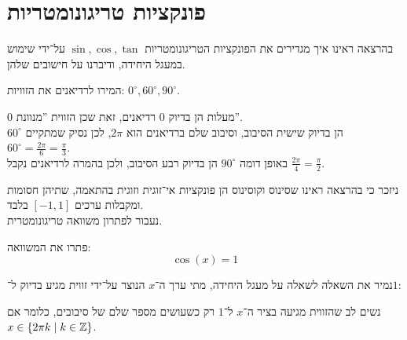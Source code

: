 \section{פונקציות טריגונומטריות}
בהרצאה ראינו איך מגדירים את הפונקציות הטריגונומטריות $\sin, \cos, \tan$ על־ידי שימוש במעגל היחידה, ודיברנו על חישובים שלהן.
\begin{exercise}
	המירו לרדיאנים את הזוויות: $0^\circ, 60^\circ, 90^\circ$.
\end{exercise}
\begin{solution}
	$0$ מעלות הן בדיוק $0$ רדיאנים, זאת שכן הזווית ''מנוונת''. \\
	$60^\circ$ הן בדיוק שישית הסיבוב, וסיבוב שלם ברדיאנים הוא $2 \pi$, לכן נסיק שמתקיים $60^\circ = \frac{2 \pi}{6} = \frac{\pi}{3}$. \\
	באופן דומה $90^\circ$ הן בדיוק רבע הסיבוב, ולכן בהמרה לרדיאנים נקבל $\frac{2 \pi}{4} = \frac{\pi}{2}$.
\end{solution}
ניזכר כי בהרצאה ראינו שסינוס וקוסינוס הן פונקציות אי־זוגית וזוגית בהתאמה, שתיהן חסומות ומקבלות ערכים $[-1, 1]$ בלבד. \\
נעבור לפתרון משוואה טריגונומטרית.
\begin{exercise}
	פתרו את המשוואה:
	\[
		\cos(x)
		= 1
	\]
\end{exercise}
\begin{solution}
	נמיר את השאלה לשאלה על מעגל היחידה, מתי ערך ה־$x$ הנוצר על־ידי זווית מגיע בדיוק ל־$1$:
	\begin{otherlanguage}{english}
		\begin{center}
		\end{center}
	\end{otherlanguage}
	נשים לב שהזווית מגיעה בציר ה־$x$ ל־$1$ רק כשעושים מספר שלם של סיבובים, כלומר אם $x \in \{ 2 \pi k \mid k \in \mathbb{Z} \}$.
\end{solution}

